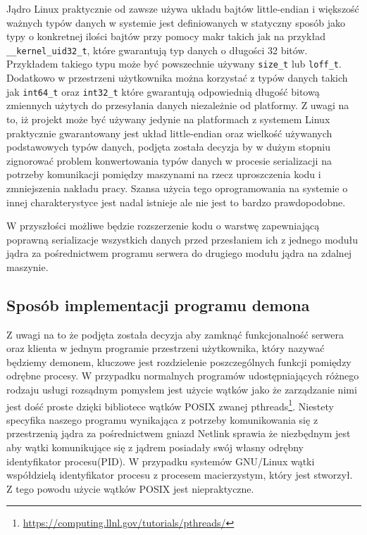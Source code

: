 \documentclass[10pt]{article}
\begin{document}
Jądro Linux praktycznie od zawsze używa układu bajtów little-endian i większość ważnych typów danych w systemie jest definiowanych w statyczny sposób jako typy o konkretnej ilości bajtów przy pomocy makr takich jak na przykład \texttt{\_\_kernel\_uid32\_t}, które gwarantują typ danych o długości 32 bitów. Przykładem takiego typu może być powszechnie używany \texttt{size\_t} lub \texttt{loff\_t}. Dodatkowo w przestrzeni użytkownika można korzystać z typów danych takich jak \texttt{int64\_t} oraz \texttt{int32\_t} które gwarantują odpowiednią długość bitową zmiennych użytych do przesyłania danych niezależnie od platformy. Z uwagi na to, iż projekt może być używany jedynie na platformach z systemem Linux praktycznie gwarantowany jest układ little-endian oraz wielkość używanych podstawowych typów danych, podjęta została decyzja by w dużym stopniu zignorować problem konwertowania typów danych w procesie serializacji na potrzeby komunikacji pomiędzy maszynami na rzecz uproszczenia kodu i zmniejszenia nakładu pracy. Szansa użycia tego oprogramowania na systemie o innej charakterystyce jest nadal istnieje ale nie jest to bardzo prawdopodobne.

W przyszłości możliwe będzie rozszerzenie kodu o warstwę zapewniającą poprawną serializacje wszystkich danych przed przesłaniem ich z jednego modułu jądra za pośrednictwem programu serwera do drugiego modułu jądra na zdalnej maszynie.

\subsection{Sposób implementacji programu demona}
\label{daemonimplementation}

Z uwagi na to że podjęta została decyzja aby zamknąć funkcjonalność serwera oraz klienta w jednym programie przestrzeni użytkownika, który nazywać będziemy demonem, kluczowe jest rozdzielenie poszczególnych funkcji pomiędzy odrębne procesy. W przypadku normalnych programów udostępniających różnego rodzaju usługi rozsądnym pomysłem jest użycie wątków jako że zarządzanie nimi jest dość proste dzięki bibliotece wątków POSIX zwanej pthreads\footnote{\url{https://computing.llnl.gov/tutorials/pthreads/}}. Niestety specyfika naszego programu wynikająca z potrzeby komunikowania się z przestrzenią jądra za pośrednictwem gniazd Netlink sprawia że niezbędnym jest aby wątki komunikujące się z jądrem posiadały swój własny odrębny identyfikator procesu(PID). W przypadku systemów GNU/Linux wątki współdzielą identyfikator procesu z procesem macierzystym, który jest stworzył. Z tego powodu użycie wątków POSIX jest niepraktyczne.
\end{document}
